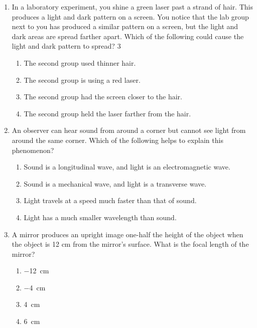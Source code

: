 \documentclass{../../../oss-classkick}
\begin{document}
\genheader


\genmultidirections

\gengravity

\raggedcolumns
\begin{multicols*}{2}
  \begin{enumerate}[leftmargin=18pt]
  \item In a laboratory experiment, you shine a green laser past a strand of
    hair. This produces a light and dark pattern on a screen. You notice that
    the lab group next to you has produced a similar pattern on a screen, but
    the light and dark areas are spread farther apart. Which of the following
    could cause the light and dark pattern to spread? 3
    \begin{enumerate}[nosep=0pt,leftmargin=18pt,label=(\Alph*)]
    \item The second group used thinner hair.
    \item The second group is using a red laser.
    \item The second group had the screen closer to the hair.
    \item The second group held the laser farther from the hair.
    \end{enumerate}
    \vspace{.7in}
    
  \item An observer can hear sound from around a corner but cannot see light
    from around the same corner. Which of the following helps to explain this
    phenomenon?
    \begin{enumerate}[nosep=0pt,leftmargin=18pt,label=(\Alph*)]
    \item Sound is a longitudinal wave, and light is an electromagnetic wave.
    \item Sound is a mechanical wave, and light is a transverse wave.
    \item Light travels at a speed much faster than that of sound.
    \item Light has a much smaller wavelength than sound.
    \end{enumerate}
    \vspace{.7in}
    
  \item A mirror produces an upright image one-half the height of the object
    when the object is 12 cm from the mirror's surface. What is the focal
    length of the mirror?
    \begin{enumerate}[nosep=0pt,leftmargin=18pt,label=(\Alph*)]
    \item\SI{-12}{\centi\metre}
    \item\SI{-4}{\centi\metre}
    \item\SI{4}{\centi\metre}
    \item\SI{6}{\centi\metre}
    \end{enumerate}


\end{enumerate}
\end{multicols*}
\end{document}
